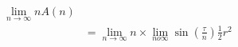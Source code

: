 \documentclass[preview]{standalone}
\begin{document}
\begin{align*}
\lim_{n \to \infty} n A (n) \\ &= \lim_{n \to \infty} n \times \lim_{n 	o \infty} \sin \left( \frac {\tau} {n} \right) \frac {1} {2} r^2
\end{align*}
\end{document}
